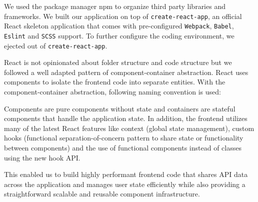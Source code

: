 We used the package manager \gls{npm} to organize third party libraries and frameworks. We built our application on top of \texttt{create-react-app}, an official React skeleton application that comes with pre-configured \texttt{Webpack}, \texttt{Babel}, \texttt{Eslint} and \texttt{SCSS} support. To further configure the coding environment, we ejected out of \texttt{create-react-app}.


React is not opinionated about folder structure and code structure but we followed a well adapted pattern of component-container abstraction. React uses components to isolate the frontend code into separate entities. With the component-container abstraction, following naming convention is used: 

Components are pure components without state and containers are stateful components that handle the application state. In addition, the frontend utilizes many of the latest React features like context (global state management), custom hooks (functional separation-of-concern pattern to share state or functionality between components) and the use of functional components instead of classes using the new hook API. 

This enabled us to build highly performant frontend code that shares API data across the application and manages user state efficiently while also providing a straightforward scalable and reusable component infrastructure. 


